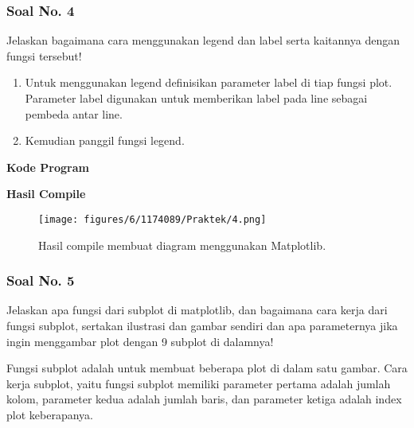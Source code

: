 \subsubsection{Soal No. 4}
\hfill \break
Jelaskan bagaimana cara menggunakan legend dan label serta kaitannya dengan fungsi tersebut!

\begin{enumerate}
	\item Untuk menggunakan legend definisikan parameter label di tiap fungsi plot. Parameter label digunakan untuk memberikan label pada line sebagai pembeda antar line.
	
	
	
	\item Kemudian panggil fungsi legend.
	
	
\end{enumerate}

\hfill \break
\textbf{Kode Program}



\hfill \break
\textbf{Hasil Compile}

\begin{figure}[H]
	\texttt{[image: figures/6/1174089/Praktek/4.png]}
	\centering
	\caption{Hasil compile membuat diagram menggunakan Matplotlib.}
\end{figure}

\subsubsection{Soal No. 5}
\hfill \break
Jelaskan apa fungsi dari subplot di matplotlib, dan bagaimana cara kerja dari fungsi subplot, sertakan ilustrasi dan gambar sendiri dan apa parameternya jika ingin menggambar plot dengan 9 subplot di dalamnya!

\hfill \break
Fungsi subplot adalah untuk membuat beberapa plot di dalam satu gambar.
\hfill \break
Cara kerja subplot, yaitu fungsi subplot memiliki parameter pertama adalah jumlah kolom, parameter kedua adalah jumlah baris, dan parameter ketiga adalah index plot keberapanya.

